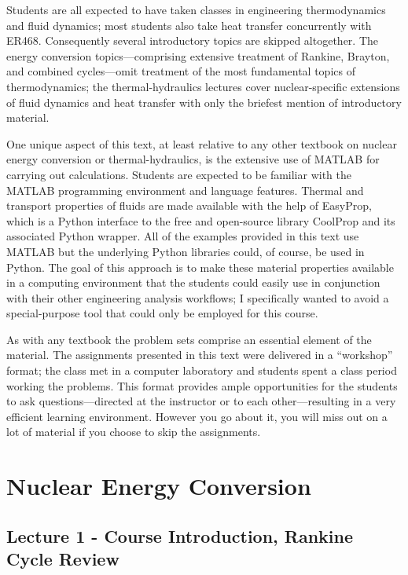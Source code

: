 \documentclass{tufte-book}
\begin{document}
Students are all expected to have taken classes in engineering thermodynamics and fluid dynamics; most students also take heat transfer concurrently with ER468.  Consequently several introductory topics are skipped altogether.  The energy conversion topics---comprising extensive treatment of Rankine, Brayton, and combined cycles---omit treatment of the most fundamental topics of thermodynamics; the thermal-hydraulics lectures cover nuclear-specific extensions of fluid dynamics and heat transfer with only the briefest mention of introductory material.



One unique aspect of this text, at least relative to any other textbook on nuclear energy conversion or thermal-hydraulics, is the extensive use of MATLAB\cite{matlab} for carrying out calculations.  Students are expected to be familiar with the MATLAB programming environment and language features.  Thermal and transport properties of fluids are made available with the help of EasyProp,\cite{easyprop} which is a Python interface to the free and open-source library CoolProp and its associated Python wrapper.\cite{coolprop_wrapper} All of the examples provided in this text use MATLAB but the underlying Python libraries could, of course, be used in Python. The goal of this approach is to make these material properties available in a computing environment that the students could easily use in conjunction with their other engineering analysis workflows; I specifically wanted to avoid a special-purpose tool that could only be employed for this course.  

As with any textbook the problem sets comprise an essential element of the material.  The assignments presented in this text were delivered in a ``workshop'' format; the class met in a computer laboratory and students spent a class period working the problems.  This format provides ample opportunities for the students to ask questions---directed at the instructor or to each other---resulting in a very efficient learning environment.  However you go about it, you will miss out on a lot of material if you choose to skip the assignments.



\mainmatter

\part{Nuclear Energy Conversion}
\chapter{Lecture 1 - Course Introduction, Rankine Cycle Review}
\label{ch:lec1}%
\end{document}
